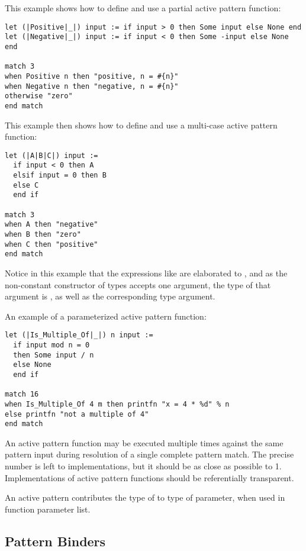 \example This example shows how to define and use a partial active pattern function:
\begin{lstlisting}
let (|Positive|_|) input := if input > 0 then Some input else None end
let (|Negative|_|) input := if input < 0 then Some -input else None end

match 3
when Positive n then "positive, n = #{n}"
when Negative n then "negative, n = #{n}"
otherwise "zero"
end match
\end{lstlisting}

\example This example then shows how to define and use a multi-case active pattern function:
\begin{lstlisting}
let (|A|B|C|) input := 
  if input < 0 then A
  elsif input = 0 then B
  else C
  end if
  
match 3
when A then "negative"
when B then "zero"
when C then "positive"
end match
\end{lstlisting}
Notice in this example that the expressions like  are elaborated to , and as the non-constant constructor of  types accepts one argument, the type of that argument is , as well as the corresponding type argument. 

\example An example of a parameterized active pattern function:
\begin{lstlisting}[deletekeywords={not,of}]
let (|Is_Multiple_Of|_|) n input := 
  if input mod n = 0
  then Some input / n
  else None
  end if
  
match 16
when Is_Multiple_Of 4 m then printfn "x = 4 * %d" % n
else printfn "not a multiple of 4"
end match
\end{lstlisting}

An active pattern function may be executed multiple times against the same pattern input during resolution of a single complete pattern match. The precise number is left to implementations, but it should be as close as possible to 1. Implementations of active pattern functions should be referentially transparent. 

An active pattern contributes the type of  to type of parameter, when used in function parameter list. 





\subsection{Pattern Binders}
\label{sec:pattern-binders}

